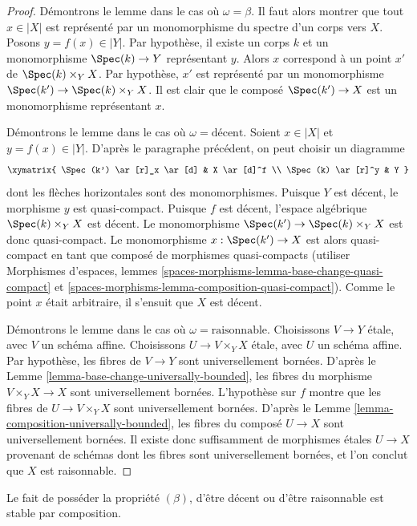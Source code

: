 \begin{proof}
Démontrons le lemme dans le cas où $\omega = \beta$. Il faut alors montrer
que tout $x \in |X|$ est représenté par un monomorphisme du spectre d'un
corps vers $X$. Posons $y = f(x) \in |Y|$. Par hypothèse, il existe un corps
$k$ et un monomorphisme $\Spec(k) \to Y$ représentant $y$.
Alors $x$ correspond à un point $x'$ de $\Spec(k) \times_Y X$.
Par hypothèse, $x'$ est représenté par un monomorphisme
$\Spec(k') \to \Spec(k) \times_Y X$. Il est clair que le composé
$\Spec(k') \to X$ est un monomorphisme représentant $x$.

\medskip\noindent
Démontrons le lemme dans le cas où $\omega = \text{décent}$.
Soient $x \in |X|$ et $y = f(x) \in |Y|$. D'après le paragraphe précédent,
on peut choisir un diagramme
$$
\xymatrix{
\Spec(k') \ar[r]_x \ar[d] & X \ar[d]^f \\
\Spec(k) \ar[r]^y & Y
}
$$
dont les flèches horizontales sont des monomorphismes. Puisque $Y$ est décent,
le morphisme $y$ est quasi-compact. Puisque $f$ est décent, l'espace
algébrique $\Spec(k) \times_Y X$ est décent. Le monomorphisme
$\Spec(k') \to \Spec(k) \times_Y X$ est donc quasi-compact.
Le monomorphisme $x : \Spec(k') \to X$ est alors quasi-compact en tant que
composé de morphismes quasi-compacts (utiliser
Morphismes d'espaces, lemmes
\ref{spaces-morphisms-lemma-base-change-quasi-compact} et
\ref{spaces-morphisms-lemma-composition-quasi-compact}).
Comme le point $x$ était arbitraire, il s'ensuit que $X$ est décent.

\medskip\noindent
Démontrons le lemme dans le cas où $\omega = \text{raisonnable}$.
Choisissons $V \to Y$ étale, avec $V$ un schéma affine.
Choisissons $U \to V \times_Y X$ étale, avec $U$ un schéma affine.
Par hypothèse, les fibres de $V \to Y$ sont universellement bornées.
D'après le
Lemme \ref{lemma-base-change-universally-bounded},
les fibres du morphisme $V \times_Y X \to X$ sont universellement bornées.
L'hypothèse sur $f$ montre que les fibres de $U \to V \times_Y X$ sont
universellement bornées. D'après le
Lemme \ref{lemma-composition-universally-bounded},
les fibres du composé $U \to X$ sont universellement bornées.
Il existe donc suffisamment de morphismes étales $U \to X$ provenant de
schémas dont les fibres sont universellement bornées, et l'on conclut que
$X$ est raisonnable.
\end{proof}

\begin{lemma}
\label{lemma-composition-relative-conditions}
Le fait de posséder la propriété $(\beta)$, d'être décent ou d'être
raisonnable est stable par composition.
\end{lemma}

